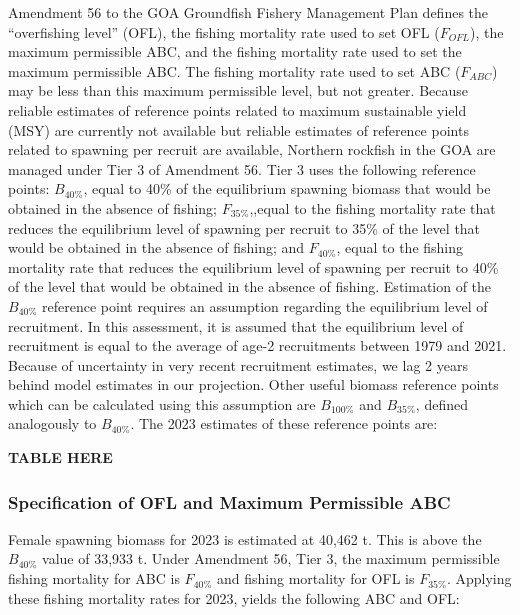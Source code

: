 \documentclass[
  11pt,
]{article}
\begin{document}
Amendment 56 to the GOA Groundfish Fishery Management Plan defines the ``overfishing level''
(OFL), the fishing mortality rate used to set OFL (\(F_{OFL}\)), the maximum permissible ABC, and the fishing mortality rate used to set the maximum permissible ABC.
The fishing mortality rate used to set ABC (\(F_{ABC}\)) may be less than this maximum permissible level, but not greater.
Because reliable estimates of reference points related to maximum sustainable yield (MSY) are currently not available but reliable estimates of reference points related to spawning per recruit are available, Northern rockfish in the GOA are managed under Tier 3 of Amendment 56.
Tier 3 uses the following reference points: \(B_{40\%}\), equal to 40\% of the equilibrium spawning biomass that would be obtained in the absence of fishing; \(F_{35\%}\),,equal to the fishing mortality rate that reduces the equilibrium level of spawning per recruit to 35\% of the level that would be obtained in the absence of fishing; and \(F_{40\%}\), equal to the fishing mortality rate that reduces the equilibrium level of spawning per recruit to 40\% of the level that would be obtained in the absence of fishing.
Estimation of the \(B_{40\%}\) reference point requires an assumption regarding the equilibrium level of recruitment.
In this assessment, it is assumed that the equilibrium level of recruitment is equal to the average of age-2 recruitments between 1979 and 2021.
Because of uncertainty in very recent recruitment estimates, we lag 2 years behind model estimates in our projection.
Other useful biomass reference points which can be calculated using this assumption are \(B_{100\%}\) and \(B_{35\%}\), defined analogously to \(B_{40\%}\).
The 2023 estimates of these reference points are:

\textbf{TABLE HERE}

\hypertarget{specification-of-ofl-and-maximum-permissible-abc}{%
\subsubsection{Specification of OFL and Maximum Permissible ABC}\label{specification-of-ofl-and-maximum-permissible-abc}}

Female spawning biomass for 2023 is estimated at 40,462 t.
This is above the \(B_{40\%}\) value of 33,933 t.
Under Amendment 56, Tier 3, the maximum permissible fishing mortality for ABC is \(F_{40\%}\) and fishing mortality for OFL is \(F_{35\%}\).
Applying these fishing mortality rates for 2023, yields the following ABC and OFL:
\end{document}
